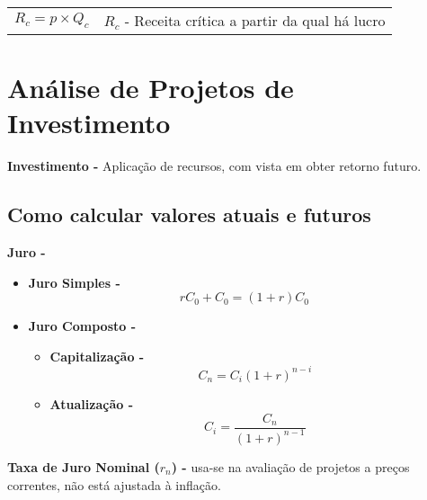 \documentclass[11pt]{article}
\begin{document}
\begin{tabular}{ c c }
    \begin{minipage}{0.45\textwidth}
        \begin{equation*}
            R_c = p \times Q_c
        \end{equation*}
    \end{minipage} &
    \begin{minipage}{0.45\textwidth}
        $R_c$ - Receita crítica a partir da qual há lucro
    \end{minipage}
\end{tabular}

\newpage

\section{Análise de Projetos de Investimento}

\textbf{Investimento -} Aplicação de recursos, com vista em obter retorno futuro.

\subsection{Como calcular valores atuais e futuros}

\textbf{Juro -}
\begin{itemize}[topsep=0pt]
    \item \textbf{Juro Simples -}
          \begin{equation*}
              rC_0+C_0=(1+r)C_0
          \end{equation*}
    \item \textbf{Juro Composto -}
          \begin{itemize}
              \item \textbf{Capitalização -}
                    \begin{equation*}
                        C_n=C_i(1+r)^{n-i}
                    \end{equation*}
              \item \textbf{Atualização -}
                    \begin{equation*}
                        C_i=\frac{C_n}{(1+r)^{n-1}}
                    \end{equation*}
          \end{itemize}
\end{itemize}

\textbf{Taxa de Juro Nominal ($r_n$) -} usa-se na avaliação de projetos a preços correntes, não está ajustada à inflação.
\end{document}
